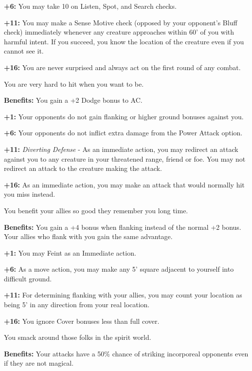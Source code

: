 \textbf{+6:} You may take 10 on Listen, Spot, and Search checks.

\textbf{+11:} You may make a Sense Motive check (opposed by your opponent's Bluff check) immediately whenever any creature approaches within 60' of you with harmful intent. If you succeed, you know the location of the creature even if you cannot see it.

\textbf{+16:} You are never surprised and always act on the first round of any combat.


You are very hard to hit when you want to be.

\textbf{Benefits:} You gain a +2 Dodge bonus to AC.

\textbf{+1:} Your opponents do not gain flanking or higher ground bonuses against you.

\textbf{+6:} Your opponents do not inflict extra damage from the Power Attack option.

\textbf{+11:} \textit{Diverting Defense} - As an immediate action, you may redirect an attack against you to any creature in your threatened range, friend or foe. You may not redirect an attack to the creature making the attack.

\textbf{+16:} As an immediate action, you may make an attack that would normally hit you miss instead.


You benefit your allies so good they remember you long time.

\textbf{Benefits:} You gain a +4 bonus when flanking instead of the normal +2 bonus. Your allies who flank with you gain the same advantage.

\textbf{+1:} You may Feint as an Immediate action.

\textbf{+6:} As a move action, you may make any 5' square adjacent to yourself into difficult ground.

\textbf{+11:} For determining flanking with your allies, you may count your location as being 5' in any direction from your real location.

\textbf{+16:} You ignore Cover bonuses less than full cover.


You smack around those folks in the spirit world.

\textbf{Benefits:} Your attacks have a 50\% chance of striking incorporeal opponents even if they are not magical.

